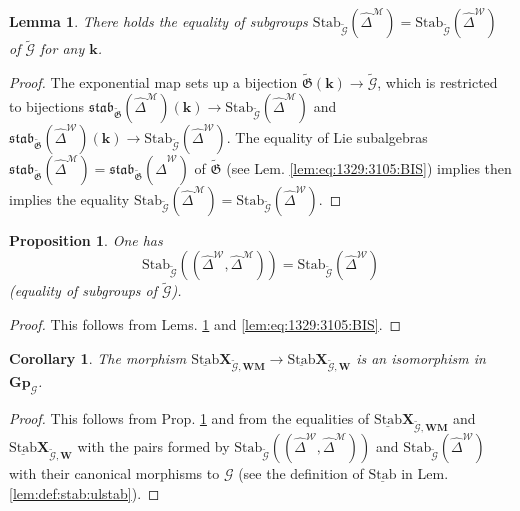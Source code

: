 \documentclass[10pt]{amsart}
\newtheorem{lem}[thm]{Lemma}
\newtheorem{cor}[thm]{Corollary}
\newtheorem{prop}[thm]{Proposition}
\numberwithin{equation}{subsection}
\begin{document}
\begin{lem}\label{lem:3:9:1328:BIS} 
There holds the equality of subgroups 
$\mathrm{Stab}_{\tilde{\mathcal G}}(\hat\Delta^{\mathcal M})=\mathrm{Stab}_{\tilde{\mathcal G}}(\hat\Delta^{\mathcal W})$ 
of $\tilde{\mathcal G}$
for any $\mathbf k$. 
\end{lem}

\begin{proof}
The exponential map sets up a bijection $\tilde{\mathfrak G}(\mathbf k)\to {\tilde{\mathcal G}}$, which is restricted to bijections
$\mathfrak{stab}_{\tilde{\mathfrak G}}(\hat\Delta^{\mathcal M})(\mathbf k)\to \mathrm{Stab}_{{\tilde{\mathcal G}}}(\hat\Delta^{\mathcal M})$
and $\mathfrak{stab}_{\tilde{\mathfrak G}}(\hat\Delta^{\mathcal W})(\mathbf k)\to \mathrm{Stab}_{{\tilde{\mathcal G}}}(\hat\Delta^{\mathcal W})$. 
The equality of Lie subalgebras 
$\mathfrak{stab}_{\tilde{\mathfrak G}}(\hat\Delta^{\mathcal M})=\mathfrak{stab}_{\tilde{\mathfrak G}}(\hat\Delta^{\mathcal W})$ of $\tilde{\mathfrak G}$ (see Lem. \ref{lem:eq:1329:3105:BIS})
implies
then implies the equality 
$\mathrm{Stab}_{{\tilde{\mathcal G}}}(\hat\Delta^{\mathcal M})=\mathrm{Stab}_{{\tilde{\mathcal G}}}(\hat\Delta^{\mathcal W})$. 
\end{proof}

\begin{prop}\label{prop:eq:411}
    One has 
    $$\mathrm{Stab}_{\tilde{\mathcal G}}((\hat\Delta^{\mathcal W},\hat\Delta^{\mathcal M}))
=\mathrm{Stab}_{\tilde{\mathcal G}}(\hat\Delta^{\mathcal W})
    $$
    (equality of subgroups of ${\tilde{\mathcal G}}$). 
\end{prop}


\begin{proof}
This follows from Lems. \ref{lem:3:9:1328:BIS} and \ref{lem:eq:1329:3105:BIS}. 
\end{proof}

\begin{cor}\label{cor:4:20:nov}
The morphism $\underline{\mathrm{Stab}}\mathbf X_{{\tilde{\mathcal G}},\mathbf{WM}}\to
\underline{\mathrm{Stab}}\mathbf X_{{\tilde{\mathcal G}},\mathbf W}$ is an isomorphism in  
 $\mathbf{Gp}_{\mathcal G}$. 
\end{cor}

\begin{proof}
This follows from Prop. \ref{prop:eq:411} and from 
the equalities of $\underline{\mathrm{Stab}}\mathbf X_{{\tilde{\mathcal G}},\mathbf{WM}}$ and $
\underline{\mathrm{Stab}}\mathbf X_{{\tilde{\mathcal G}},\mathbf W}$ with the pairs formed by 
$\mathrm{Stab}_{\tilde{\mathcal G}}((\hat\Delta^{\mathcal W},\hat\Delta^{\mathcal M}))
$ and $\mathrm{Stab}_{\tilde{\mathcal G}}(\hat\Delta^{\mathcal W})$ with their canonical morphisms to 
$\mathcal G$ (see the definition of $\underline{\mathrm{Stab}}$ in Lem. \ref{lem:def:stab:ulstab}). 
\end{proof}
\end{document}
